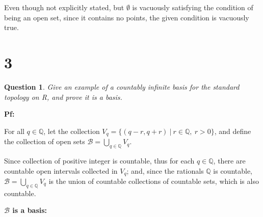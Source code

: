 \documentclass{article}
\newtheorem{question}{Question}
\begin{document}
Even though not explicitly stated, but $\emptyset$ is vacuously satisfying the condition of being an open set,
since it contains no points, the given condition is vacuously true.



\break

\section*{3}
\begin{question}
    Give an example of a countably infinite basis for the standard topology on R, 
    and prove it is a basis.
\end{question}

\textbf{Pf:}

For all $q\in \mathbb{Q}$, let the collection $V_q=\{(q-r,q+r)\ |\ r\in\mathbb{Q},\ r>0\}$, 
and define the collection of open sets $\mathcal{B}=\bigcup_{q\in \mathbb{Q}}V_q$.

Since collection of positive integer is countable, thus for each $q\in\mathbb{Q}$, there are countable open intervals collected in $V_q$;
and, since the rationals $\mathbb{Q}$ is countable, $\mathcal{B}=\bigcup_{q\in \mathbb{Q}}V_q$ is the union of countable collections of countable sets,
which is also countable.

\hfill

\textbf{$\mathcal{B}$ is a basis:}
\end{document}
